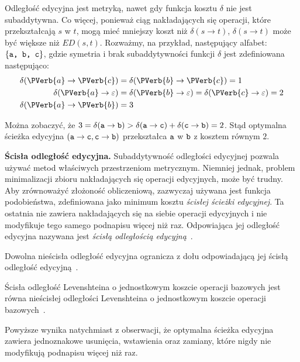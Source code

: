 \documentclass{praca1}
\begin{document}
Odległość edycyjna jest metryką, nawet gdy funkcja kosztu $\delta$ nie jest subaddytywna. Co więcej, ponieważ ciąg nakładających się operacji, które przekształcają $s$ w $t$, mogą mieć mniejszy koszt niż $\delta(s \rightarrow t)$, $\delta(s \rightarrow t)$ może być większe niż $ED(s,t)$. Rozważmy, na przykład, następujący alfabet: $\{\verb|a, b, c|\}$, gdzie symetria i brak subaddytywności funkcji $\delta$ jest zdefiniowana następująco:
\begin{align*}
\delta(\PVerb{a} \rightarrow \PVerb{c}) &= \delta(\PVerb{b} \rightarrow \PVerb{c}) = 1 \\
\delta(\PVerb{a} \rightarrow \varepsilon) &= \delta(\PVerb{b} \rightarrow \varepsilon) = \delta(\PVerb{c} \rightarrow \varepsilon) = 2 \\
\delta(\PVerb{a} \rightarrow \PVerb{b}) &= 3
\end{align*}

Można zobaczyć, że $3 = \delta(\verb|a| \rightarrow \verb|b|) > \delta(\verb|a| \rightarrow \verb|c|) + \delta(\verb|c| \rightarrow \verb|b|) = 2$. Stąd optymalna ścieżka edycyjna $(\verb|a| \rightarrow \verb|c|, \verb|c| \rightarrow \verb|b|)$ przekształca $\verb|a|$ w $\verb|b|$ z kosztem równym $2$.

\textbf{Ścisła odległość edycyjna.} Subaddytywność odległości edycyjnej pozwala używać metod właściwych przestrzeniom metrycznym. Niemniej jednak, problem minimalizacji zbioru nakładających się operacji edycyjnych, może być trudny. Aby zrównoważyć złożoność obliczeniową, zazwyczaj używana jest funkcja podobieństwa, zdefiniowana jako minimum kosztu \emph{ścisłej ścieżki edycyjnej}. Ta ostatnia nie zawiera nakładających się na siebie operacji edycyjnych i nie modyfikuje tego samego podnapisu więcej niż raz. Odpowiająca jej odległość edycyjna nazywana jest \emph{ścisłą odległością edycyjną}~\cite{Boytsov2011:indexingmethods}.

\begin{lemma}
Dowolna nieścisła odległość edycyjna ogranicza z dołu odpowiadającą jej ścisłą odległość edycyjną~\cite{Boytsov2011:indexingmethods}.
\end{lemma}

\begin{lemma}
\label{lem:001}
Ścisła odległość Levenshteina o jednostkowym koszcie operacji bazowych jest równa nieścisłej odległości Levenshteina o jednostkowym koszcie operacji bazowych~\cite{Boytsov2011:indexingmethods}.
\end{lemma}

Powyższe wynika natychmiast z obserwacji, że optymalna ścieżka edycyjna zawiera jednoznakowe usunięcia, wstawienia oraz zamiany, które nigdy nie modyfikują podnapisu więcej niż raz.
\end{document}

